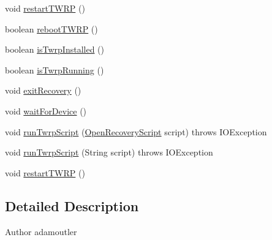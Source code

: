 \begin{DoxyCompactItemize}
void \hyperlink{class_c_a_s_u_a_l_1_1communicationstools_1_1adb_1_1twrprecovery_1_1_twrp_communications_a06da03c516b579936db4d619a1f94028}{restart\-T\-W\-R\-P} ()
\item 
boolean \hyperlink{class_c_a_s_u_a_l_1_1communicationstools_1_1adb_1_1twrprecovery_1_1_twrp_communications_a79f3a2177b2132fabc25a28cdcf6f4a0}{reboot\-T\-W\-R\-P} ()
\item 
boolean \hyperlink{class_c_a_s_u_a_l_1_1communicationstools_1_1adb_1_1twrprecovery_1_1_twrp_communications_ad625c10bec0a375663b86d021b5d843b}{is\-Twrp\-Installed} ()
\item 
boolean \hyperlink{class_c_a_s_u_a_l_1_1communicationstools_1_1adb_1_1twrprecovery_1_1_twrp_communications_aeef17fb9fd13b69ea1a4de9ae0b299d6}{is\-Twrp\-Running} ()
\item 
void \hyperlink{class_c_a_s_u_a_l_1_1communicationstools_1_1adb_1_1twrprecovery_1_1_twrp_communications_a226e129d59283666e0fb0dbec3fba05d}{exit\-Recovery} ()
\item 
void \hyperlink{class_c_a_s_u_a_l_1_1communicationstools_1_1adb_1_1twrprecovery_1_1_twrp_communications_afebd579552027ba9cea83ac0218f17ab}{wait\-For\-Device} ()
\item 
void \hyperlink{class_c_a_s_u_a_l_1_1communicationstools_1_1adb_1_1twrprecovery_1_1_twrp_communications_a7efbe0e91836f3da1c3ab3d0093ee2f5}{run\-Twrp\-Script} (\hyperlink{class_c_a_s_u_a_l_1_1communicationstools_1_1adb_1_1twrprecovery_1_1_open_recovery_script}{Open\-Recovery\-Script} script)  throws I\-O\-Exception 
\item 
void \hyperlink{class_c_a_s_u_a_l_1_1communicationstools_1_1adb_1_1twrprecovery_1_1_twrp_communications_a5b58a91d9dff5c79ec726935c9875825}{run\-Twrp\-Script} (String script)  throws I\-O\-Exception 
\item 
void \hyperlink{class_c_a_s_u_a_l_1_1communicationstools_1_1adb_1_1twrprecovery_1_1_twrp_communications_a06da03c516b579936db4d619a1f94028}{restart\-T\-W\-R\-P} ()
\end{DoxyCompactItemize}


\subsection{Detailed Description}
\begin{DoxyAuthor}{Author}
adamoutler 
\end{DoxyAuthor}


